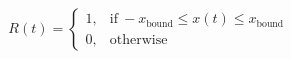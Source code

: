 %
\begin{equation} \label{eqn:Reward_function}
    R(t) =
    \begin{cases}
        1, & \text{if}\ -x_\text{bound} \leq x(t) \leq x_\text{bound} \\
        0, & \text{otherwise}
    \end{cases}
\end{equation}

